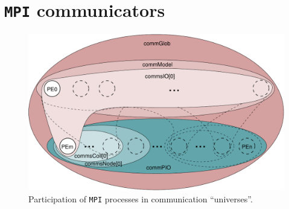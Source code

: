 \section{{\tt MPI} communicators}

\begin{figure}[H]
\centering
\includegraphics[scale=0.6]{../graphics/communicators.pdf}
\caption {Participation of {\tt MPI} processes in communication 
``universes''.}
\label{communicators}
\end{figure}
